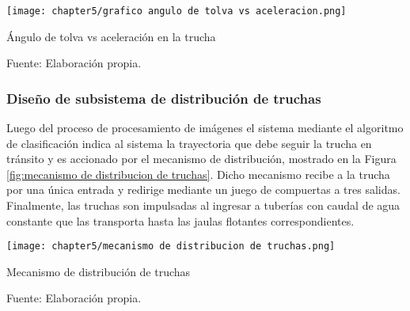 
\begin{myfigure}[H]
	\footnotesize\centering
	\texttt{[image: chapter5/grafico angulo de tolva vs aceleracion.png]}
	\caption{Ángulo de tolva vs aceleración en la trucha}
	\begin{myflushcenter}
		Fuente: Elaboración propia.
	\end{myflushcenter}
	\label{fig:grafico angulo de tolva vs aceleracion}
\end{myfigure}

\subsubsection{Diseño de subsistema de distribución de truchas}

Luego del proceso de procesamiento de imágenes el sistema mediante el algoritmo de clasificación indica al sistema la trayectoria que debe seguir la trucha en tránsito y es accionado por el mecanismo de distribución, mostrado en la Figura \ref{fig:mecanismo de distribucion de truchas}. Dicho mecanismo recibe a la trucha por una única entrada y redirige mediante un juego de compuertas a tres salidas. Finalmente, las truchas son impulsadas al ingresar a tuberías con caudal de agua constante que las transporta hasta las jaulas flotantes correspondientes.

\begin{myfigure}[H]
	\footnotesize\centering
	\texttt{[image: chapter5/mecanismo de distribucion de truchas.png]}
	\caption{Mecanismo de distribución de truchas}
	\begin{myflushcenter}
		Fuente: Elaboración propia.
	\end{myflushcenter}
	\label{fig:mecanismo de distribucion de truchas}
\end{myfigure}

